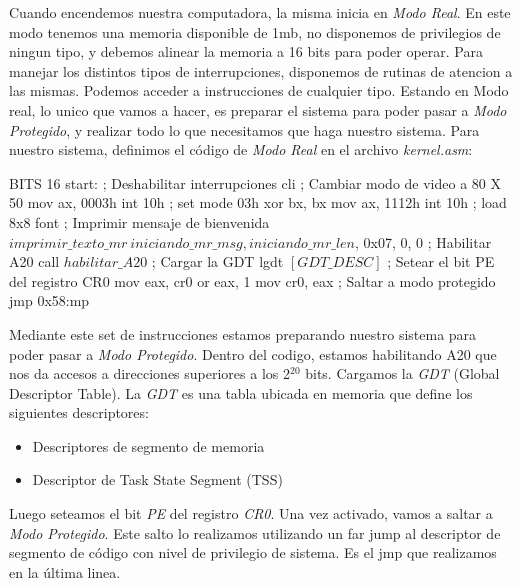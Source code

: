 Cuando encendemos nuestra computadora, la misma inicia en \textit{Modo Real}. En este modo tenemos una memoria disponible de 1mb, no disponemos de privilegios de ningun tipo, y debemos alinear la memoria a 16 bits para poder operar.
Para manejar los distintos tipos de interrupciones, disponemos de rutinas de atencion a las mismas. Podemos acceder a instrucciones de cualquier tipo.
Estando en Modo real, lo unico que vamos a hacer, es preparar el sistema para poder pasar a \textit{Modo Protegido}, y realizar todo lo que necesitamos que haga nuestro sistema.
Para nuestro sistema, definimos el c\'odigo de \textit{Modo Real} en el archivo \textit{kernel.asm}:

\begin{algorithmic}
\State \tab BITS 16
\State \tab start:
    \State \tab \tab ; Deshabilitar interrupciones
    \State \tab \tab cli
\newline
\State \tab \tab     ; Cambiar modo de video a 80 X 50
    \State \tab \tab mov ax, 0003h
    \State \tab \tab int 10h ; set mode 03h
    \State \tab \tab xor bx, bx
    \State \tab \tab mov ax, 1112h
    \State \tab \tab int 10h ; load 8x8 font
\newline
    \State \tab \tab ; Imprimir mensaje de bienvenida
    \State \tab \tab $imprimir\_texto\_mr \ iniciando\_mr\_msg, iniciando\_mr\_len$, 0x07, 0, 0
    \State \tab \tab ; Habilitar A20
    \State \tab \tab call $habilitar\_A20$
    \State \tab \tab ; Cargar la GDT
    \State \tab \tab lgdt $[GDT\_DESC]$
    \newline
    \State \tab \tab ; Setear el bit PE del registro CR0
    \State \tab \tab mov eax, cr0
    \State \tab \tab or eax, 1
    \State \tab \tab mov cr0, eax
    \newline
    \State \tab \tab ; Saltar a modo protegido
    \State \tab \tab jmp 0x58:mp

    \end{algorithmic}

Mediante este set de instrucciones estamos preparando nuestro sistema para poder pasar a \textit{Modo Protegido}.
Dentro del codigo, estamos habilitando A20 que nos da accesos a direcciones superiores a los 2$^{20}$ bits.\newline
Cargamos la \textit{GDT} (Global Descriptor Table).
La \textit{GDT} es una tabla ubicada en memoria que define los siguientes descriptores:
\begin{itemize}
    \item Descriptores de segmento de memoria
    \item Descriptor de Task State Segment (TSS)
\end{itemize}
Luego seteamos el bit \textit{PE} del registro \textit{CR0}.
\newline
Una vez activado, vamos a saltar a \textit{Modo Protegido}. Este salto lo realizamos utilizando un far jump al descriptor de segmento de c\'odigo con nivel de privilegio de sistema. Es el jmp que realizamos en la \'ultima linea.
